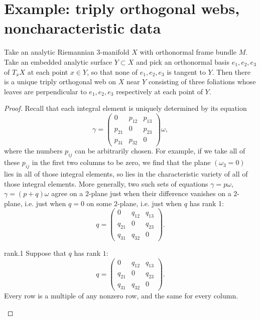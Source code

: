 \section{Example: triply orthogonal webs, noncharacteristic data}
\begin{theorem}
Take an analytic Riemannian 3-manifold \(X\) with orthonormal frame bundle \(M\).
Take an embedded analytic surface \(Y \subset X\) and pick an orthonormal basis \(e_1,e_2,e_3\) of \(T_x X\) at each point \(x \in Y\), so that none of \(e_1,e_2,e_3\) is tangent to \(Y\).
Then there is a unique triply orthogonal web on \(X\) near \(Y\) consisting of three foliations whose leaves are perpendicular to \(e_1,e_2,e_3\) respectively at each point of \(Y\).
\end{theorem}
\begin{proof}
Recall that each integral element is uniquely determined by its equation
\[
\gamma=
\begin{pmatrix}
0 & p_{12} & p_{13} \\
p_{21} & 0 & p_{23} \\
p_{31} & p_{32} & 0 
\end{pmatrix}
\omega,
\]
where the numbers \(p_{ij}\) can be arbitrarily chosen.
For example, if we take all of these \(p_{ij}\) in the first two columns to be zero, we find that the plane \((\omega_3=0)\) lies in all of those integral elements, so lies in the characteristic variety of all of those integral elements.
More generally, two such sets of equations \(\gamma=p \omega\), \(\gamma=(p+q)\omega\) agree on a \(2\)-plane just when their difference vanishes on a \(2\)-plane, i.e. just when \(q=0\) on some \(2\)-plane, i.e. just when \(q\) has rank 1:
\[
q=
\begin{pmatrix}
0 & q_{12} & q_{13} \\
q_{21} & 0 & q_{23} \\
q_{31} & q_{32} & 0 
\end{pmatrix}.
\]
\begin{answer}{rank.1}%
Suppose that \(q\) has rank \(1\):
\[
q=
\begin{pmatrix}
0 & q_{12} & q_{13} \\
q_{21} & 0 & q_{23} \\
q_{31} & q_{32} & 0 
\end{pmatrix}.
\]
Every row is a multiple of any nonzero row, and the same for every column.

\end{answer}
\end{proof}
